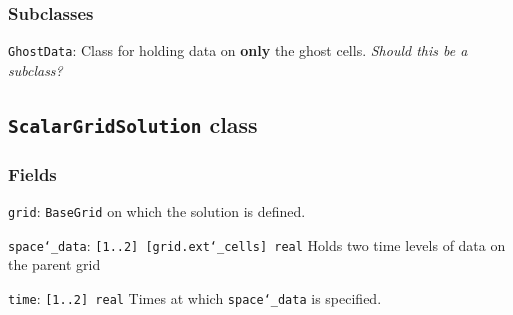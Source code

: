 \documentclass[11pt]{article}
\newcommand{\uscore}{\char`\_}
\begin{document}
\subsubsection*{Subclasses}

\texttt{GhostData}: Class for holding data on \textbf{only} the ghost cells.  \textit{Should this be a subclass?}




\subsection*{\texttt{ScalarGridSolution} class}

\subsubsection*{Fields}

\texttt{grid}: \texttt{BaseGrid} on which the solution is defined.

\texttt{space\uscore{}data}: \texttt{[1..2] [grid.ext\uscore{}cells] real}
Holds two time levels of data on the parent grid

\texttt{time}: \texttt{[1..2] real}  Times at which \texttt{space\uscore{}data} is specified.
\end{document}
